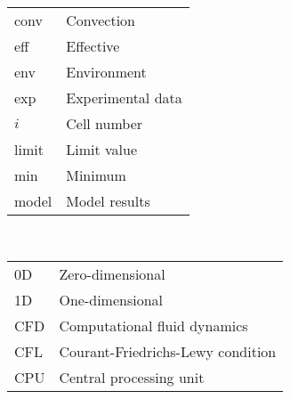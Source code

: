 \\
\begin{supertabular}{@{}ll} %
  conv & Convection \\
  eff & Effective \\
  env & Environment \\
  exp & Experimental data \\
  $i$ & Cell number \\
  limit & Limit value \\
  min & Minimum \\
  model & Model results \\
\end{supertabular}


\\
\fontsize{\fontSize}{\lineSpacing}\selectfont
\begin{supertabular}{@{}ll} %
  0D & Zero-dimensional \\
  1D & One-dimensional \\
  CFD & Computational fluid dynamics \\
  CFL & Courant-Friedrichs-Lewy condition \\
  CPU & Central processing unit \\
\end{supertabular}
